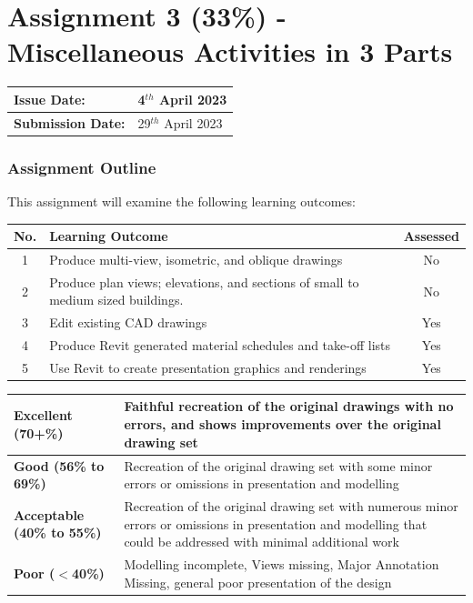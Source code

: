 
	

\part*{Assignment 3 (33\%) - Miscellaneous Activities in 3 Parts}



\begin{tabularx}{\textwidth}{ |X|X| }
	\hline
	\textbf{Issue Date:} & 4$^{th}$ April 2023 \\
	\hline 
	\textbf{Submission Date:}  & 29$^{th}$ April 2023  \\
	\hline
\end{tabularx}



\section*{Assignment Outline}

This assignment will examine the following learning outcomes:

\begin{tabularx}{\textwidth}{ |c|X|c| }
	\hline
	\textbf{No.} & \textbf{Learning Outcome} & \textbf{Assessed} \\
	\hline 
	1  & Produce multi-view, isometric, and oblique drawings & No \\
	2  & Produce plan views; elevations, and sections of small to medium sized buildings. & No \\
	3  & Edit existing CAD drawings & Yes \\
	4  & Produce Revit generated material schedules and take-off lists & Yes \\
	5  & Use Revit to create presentation graphics and renderings & Yes \\
	\hline
\end{tabularx}

\vspace{1cm}

\begin{tabularx}{\textwidth}{ |l|X| }
	\hline 
	\textbf{Excellent (70+\%)} & Faithful recreation of the original drawings with no errors, and shows improvements over the original drawing set\\ 
	\hline
	\textbf{Good (56\% to 69\%)} & Recreation of the original drawing set with some minor errors or omissions in presentation and modelling \\
	\hline
	\textbf{Acceptable (40\% to 55\%)} & Recreation of the original drawing set with numerous minor errors or omissions in presentation and modelling that could be addressed with minimal additional work \\ 
	\hline
	\textbf{Poor ($<$40\%)} & Modelling incomplete, Views missing, Major Annotation Missing, general poor presentation of the design  \\
	\hline
\end{tabularx}

